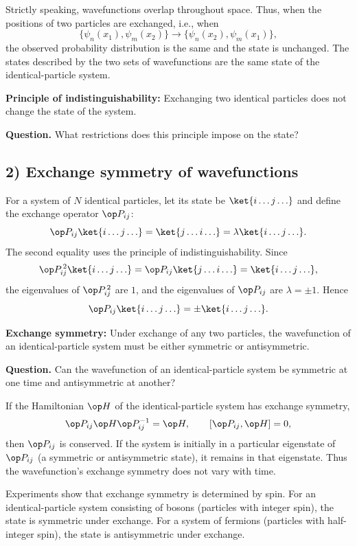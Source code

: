 Strictly speaking, wavefunctions overlap throughout space. Thus, when the positions of two particles are exchanged, i.e., when
\[\{\psi_n(x_1),\psi_m(x_2)\}
\longrightarrow\{\psi_n(x_2),\psi_m(x_1)\},\]
the observed probability distribution is the same and the state is unchanged. The states described by the two sets of wavefunctions are the same state of the identical-particle system.

\textbf{Principle of indistinguishability:} Exchanging two identical particles does not change the state of the system.

\textbf{Question.} What restrictions does this principle impose on the state?

\subsection*{2) Exchange symmetry of wavefunctions}
For a system of $N$ identical particles, let its state be $\ket{i\ldots j\ldots}$ and define the exchange operator $\op P_{ij}$:
\[\op P_{ij}\ket{i\ldots j\ldots}
=\ket{j\ldots i\ldots}
=\lambda\ket{i\ldots j\ldots}.\]
The second equality uses the principle of indistinguishability. Since
\[\op P_{ij}^{\,2}\ket{i\ldots j\ldots}
=\op P_{ij}\ket{j\ldots i\ldots}
=\ket{i\ldots j\ldots},\]
the eigenvalues of $\op P_{ij}^{\,2}$ are $1$, and the eigenvalues of $\op P_{ij}$ are $\lambda=\pm1$. Hence
\[\op P_{ij}\ket{i\ldots j\ldots}
=\pm\ket{i\ldots j\ldots}.\]

\textbf{Exchange symmetry:} Under exchange of any two particles, the wavefunction of an identical-particle system must be either symmetric or antisymmetric.

\textbf{Question.} Can the wavefunction of an identical-particle system be symmetric at one time and antisymmetric at another?

If the Hamiltonian $\op H$ of the identical-particle system has exchange symmetry,
\[\op P_{ij}\op H\op P_{ij}^{-1}=\op H,\qquad
[\op P_{ij},\op H]=0,\]
then $\op P_{ij}$ is conserved. If the system is initially in a particular eigenstate of $\op P_{ij}$ (a symmetric or antisymmetric state), it remains in that eigenstate. Thus the wavefunction's exchange symmetry does not vary with time.

Experiments show that exchange symmetry is determined by spin. For an identical-particle system consisting of bosons (particles with integer spin), the state is symmetric under exchange. For a system of fermions (particles with half-integer spin), the state is antisymmetric under exchange.

